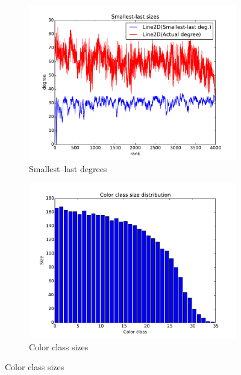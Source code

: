 \documentclass[oneside, titlepage]{scrartcl}
\begin{document}
\begin{figure}[!h]
\begin{subfigure}{0.5\textwidth}
	\centering
	\includegraphics[width=0.9\linewidth]{figures/ordering8.pdf}
	\caption{Smallest--last degrees}
\end{subfigure}%
\begin{subfigure}{0.5\textwidth}
	\centering
	\includegraphics[width=0.9\linewidth]{figures/colors8.pdf}
	\caption{Color class sizes}
\end{subfigure}


\end{figure}
\end{document}
